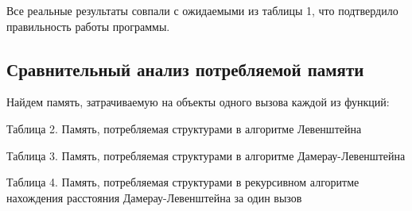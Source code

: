 \documentclass[a4paper, 14pt]{article}
\begin{document}
\begin{center}
\begin{flushleft}
        Все реальные результаты совпали с ожидаемыми из таблицы 1, что подтвердило правильность работы программы.
                
        \end{flushleft}
    \end{center}
	\subsection{Сравнительный анализ потребляемой памяти}
	Найдем память, затрачиваемую на объекты одного вызова каждой из функций:\\
	\begin{center}
  	Таблица 2. Память, потребляемая структурами в алгоритме Левенштейна\\
	\end{center}
	
	\begin{center}
  	Таблица 3. Память, потребляемая структурами в алгоритме Дамерау-Левенштейна\\
	\end{center}
	
			\begin{center}
  	Таблица 4. Память, потребляемая структурами в рекурсивном алгоритме нахождения расстояния Дамерау-Левенштейна за один вызов\\
	\end{center}
	
\end{document}
